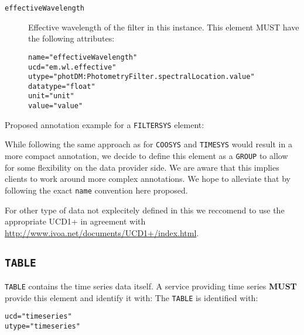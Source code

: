 \documentclass[11pt,a4paper]{ivoa}
\let\fg=\color
\def\attr#1{{\tt{\fg{DarkRed}#1}}}
\def\elem#1{{\tt{\fg{DarkRed}#1}}}
\def\attrval#1#2{{\tt{\fg{DarkRed}#1}="{\fg{DarkPurple}#2}"}}
\begin{document}
\begin{description}
\item[\elem{effectiveWavelength}] Effective wavelength of the filter in this instance. This element MUST have the following attributes:
\begin{description}
    \item[\attrval{name}{effectiveWavelength}]
    \item[\attrval{ucd}{em.wl.effective}]
    \item[\attrval{utype}{photDM:PhotometryFilter.spectralLocation.value}] 
    \item[\attrval{datatype}{float}]
    \item[\attrval{unit}{unit}]
    \item[\attrval{value}{value}]
\end{description}
\end{description}

%
 
Proposed annotation example for a \elem{FILTERSYS} element:


While following the same approach as for \elem{COOSYS} and \elem{TIMESYS} would result in a more compact annotation, we decide to define this element as a \elem{GROUP} to allow for some flexibility on the data provider side. We are aware that this implies clients to work around more complex annotations. We hope to alleviate that by following the exact \attr{name} convention here proposed. 

%

For other type of data not explecitely defined in this we reccomend to use the appropriate UCD1+ in agreement with \url{http://www.ivoa.net/documents/UCD1+/index.html}. 

%
\subsection{\elem{TABLE}}
\elem{TABLE} contains the time series data itself. A service providing time series \textbf{MUST} provide this element and identify it with:
The \elem{TABLE} is identified with:
\begin{description}
\item[\attrval{ucd}{timeseries}]
\item[\attrval{utype}{timeseries}]
\end{description}
\end{document}
